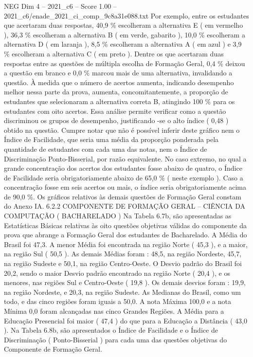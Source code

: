 \begin{textsample}{NEG Dim 4 – 2021\_c6 – Score 1.00 – 2021\_c6/enade\_2021\_ci\_comp\_9c8a31e088.txt}
Por exemplo, entre os estudantes que acertaram duas respostas, 40,9 \% escolheram a alternativa E ( em vermelho ), 36,3 \% escolheram a alternativa B ( em verde, gabarito ), 10,0 \% escolheram a alternativa D ( em laranja ), 8,5 \% escolheram a alternativa A ( em azul ) e 3,9 \% escolheram a alternativa C ( em preto ).
Dentre os que acertaram duas respostas entre as questões de múltipla escolha de Formação Geral, 0,4 \% deixou a questão em branco e 0,0 \% marcou mais de uma alternativa, invalidando a questão.
À medida que o número de acertos aumenta, indicando desempenho melhor nessa parte da prova, aumenta, concomitantemente, a proporção de estudantes que selecionaram a alternativa correta B, atingindo 100 \% para os estudantes com oito acertos.
Essa análise permite verificar como a questão discriminou os grupos de desempenho, justificando -se o alto índice ( 0,48 ) obtido na questão.
Cumpre notar que não é possível inferir deste gráfico nem o Índice de Facilidade, que seria uma média da proporção ponderada pela quantidade de estudantes com cada uma das notas, nem o Índice de Discriminação Ponto-Bisserial, por razão equivalente.
No caso extremo, no qual a grande concentração dos acertos dos estudantes fosse abaixo de quatro, o Índice de Facilidade seria obrigatoriamente abaixo de 65,0 \% ( neste exemplo ).
Caso a concentração fosse em seis acertos ou mais, o índice seria obrigatoriamente acima de 90,0 \%.
Os gráficos relativos às demais questões de Formação Geral constam do Anexo IA. 6.2.2 COMPONENTE DE FORMAÇÃO GERAL – CIÊNCIA DA COMPUTAÇÃO ( BACHARELADO ) Na Tabela 6.7b, são apresentadas as Estatísticas Básicas relativas às oito questões objetivas válidas do componente da prova que abrange a Formação Geral dos estudantes de Bacharelado.
A Média do Brasil foi 47,3.
A menor Média foi encontrada na região Norte ( 45,3 ), e a maior, na região Sul ( 50,5 ).
As demais Médias foram : 48,5, na região Nordeste, 45,7, na região Sudeste e 50,1, na região Centro-Oeste.
O Desvio padrão do Brasil foi 20,2, sendo o maior Desvio padrão encontrado na região Norte ( 20,4 ), e os menores, nas regiões Sul e Centro-Oeste ( 19,8 ).
Os demais desvios foram : 19,9, na região Nordeste, e 20,3, na região Sudeste.
As Medianas do Brasil, como um todo, e das cinco regiões foram iguais a 50,0.
A nota Máxima 100,0 e a nota Mínima 0,0 foram alcançadas nas cinco Grandes Regiões.
A Média para a Educação Presencial foi maior ( 47,4 ) do que para a Educação a Distância ( 43,0 ).
Na Tabela 6.8b, são apresentados o Índice de Facilidade e o Índice de Discriminação ( Ponto-Bisserial ) para cada uma das questões objetivas do Componente de Formação Geral.

\end{textsample}
